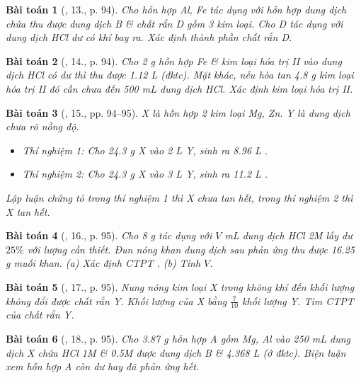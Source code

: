 \documentclass{article}
\newtheorem{baitoan}{Bài toán}
\begin{document}
\begin{baitoan}[\cite{An_Hoa_Hoc_nang_cao_8_9}, 13., p. 94]
	Cho hỗn hợp {\rm Al, Fe} tác dụng với hỗn hợp dung dịch chứa {\rm{}} thu được dung dịch B \& chất rắn D gồm 3 kim loại. Cho D tác dụng với dung dịch {\rm HCl} dư có khí bay ra. Xác định thành phần chất rắn D.
\end{baitoan}

\begin{baitoan}[\cite{An_Hoa_Hoc_nang_cao_8_9}, 14., p. 94]
	Cho {\rm2 g} hỗn hợp {\rm Fe} \& kim loại hóa trị II vào dung dịch {\rm HCl} có dư thì thu được {\rm1.12 L } (đktc). Mặt khác, nếu hòa tan {\rm4.8 g} kim loại hóa trị II đó cần chưa đến {\rm500 mL} dung dịch {\rm HCl}. Xác định kim loại hóa trị II.
\end{baitoan}

\begin{baitoan}[\cite{An_Hoa_Hoc_nang_cao_8_9}, 15., pp. 94--95]
	X là hỗn hợp 2 kim loại {\rm Mg, Zn}. Y là dung dịch {\rm{}} chưa rõ nồng độ.
	\begin{itemize}
		\item Thí nghiệm 1: Cho {\rm24.3 g} X vào {\rm2 L} Y, sinh ra {\rm8.96 L }.
		\item Thí nghiệm 2: Cho {\rm24.3 g} X vào {\rm3 L} Y, sinh ra {\rm11.2 L }.
	\end{itemize}
	Lập luận chứng tỏ trong thí nghiệm 1 thì X chưa tan hết, trong thí nghiệm 2 thì X tan hết.
\end{baitoan}

\begin{baitoan}[\cite{An_Hoa_Hoc_nang_cao_8_9}, 16., p. 95]
	Cho {\rm8 g } tác dụng với $V$ {\rm mL} dung dịch {\rm HCl 2M} lấy dư $25\%$ với lượng cần thiết. Đun nóng khan dung dịch sau phản ứng thu được {\rm16.25 g} muối khan. (a) Xác định {\rm CTPT} {\rm{}}. (b) Tính $V$.
\end{baitoan}

\begin{baitoan}[\cite{An_Hoa_Hoc_nang_cao_8_9}, 17., p. 95]
	Nung nóng kim loại X trong không khí đến khối lượng không đổi được chất rắn Y. Khối lượng của X bằng $\frac{7}{10}$ khối lượng Y. Tìm {\rm CTPT} của chất rắn Y.
\end{baitoan}

\begin{baitoan}[\cite{An_Hoa_Hoc_nang_cao_8_9}, 18., p. 95]
	Cho {\rm3.87 g} hỗn hợp A gồm {\rm Mg, Al} vào {\rm250 mL} dung dịch X chứa {\rm HCl 1M} \& {\rm{} 0.5M} được dung dịch B \& {\rm4.368 L } (ở đktc). Biện luận xem hỗn hợp A còn dư hay đã phản ứng hết.
\end{baitoan}
\end{document}
